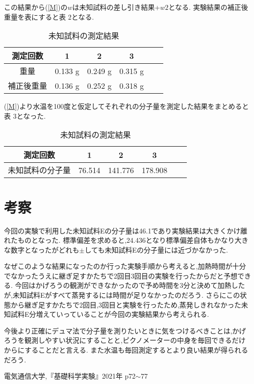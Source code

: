 \documentclass[a4j,10pt]{jarticle}
\begin{document}
  この結果から(\ref{M})の$w$は未知試料の差し引き結果+$w2$となる.
  実験結果の補正後重量を表にすると表 2となる.
  \begin{table}[h]
    \begin{center}
      \caption{未知試料の測定結果}
      \begin{tabular}{c|ccccc}
        \hline
        測定回数 & 1 & 2 & 3  \\ \hline
        重量 & 0.133 g & 0.249 g & 0.315 g \\
        補正後重量 & 0.136 g & 0.252 g & 0.318 g \\
        \hline
      \end{tabular}
    \end{center}
  \end{table}


  (\ref{M})より水温を100度と仮定してそれぞれの分子量を測定した結果をまとめると表 3となった.
  \begin{table}[h]
    \begin{center}
      \caption{未知試料の測定結果}
      \begin{tabular}{c|ccccc}
        \hline
        測定回数 & 1 & 2 & 3  \\ \hline
        未知試料の分子量 & 76.514 & 141.776 & 178.908 \\
        \hline
      \end{tabular}
    \end{center}
  \end{table}

  \section{考察}
  今回の実験で利用した未知試料Eの分子量は46.1であり実験結果は大きくかけ離れたものとなった.
  標準偏差を求めると,24.436となり標準偏差自体もかなり大きな数字となったがどれも$\pm$しても未知試料Eの分子量には近づかなかった.


  なぜこのような結果になったのか行った実験手順から考えると,加熱時間が十分でなかったうえに継ぎ足すかたちで2回目3回目の実験を行ったからだと予想できる.
  今回はかげろうの観測ができなかったので予め時間を3分と決めて加熱したが,未知試料Eがすべて蒸発するには時間が足りなかったのだろう.
  さらにこの状態から継ぎ足すかたちで2回目,3回目と実験を行ったため,蒸発しきれなかった未知試料E分増えていっていることが今回の実験結果から考えられる.

  今後より正確にデュマ法で分子量を測りたいときに気をつけるべきことは,かげろうを観測しやすい状況にすることと,ピクノメーターの中身を毎回できるだけからにすることだと言える.
  また水温も毎回測定するとより良い結果が得られるだろう.

  \begin{thebibliography}{9}
     電気通信大学,『基礎科学実験』2021年 p72$\sim$77
    \end{thebibliography}
    
\end{document}
